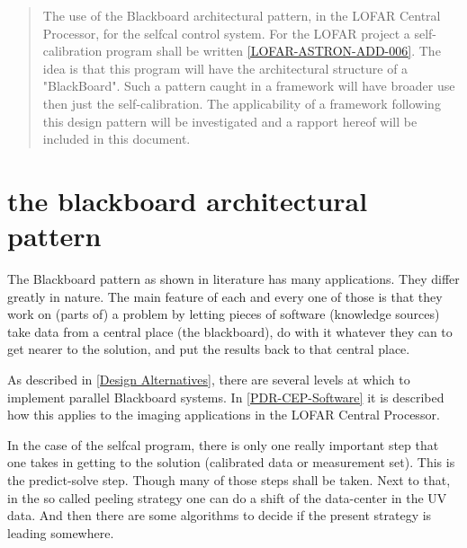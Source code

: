 \documentclass[]{lofar}
\begin{document}
  \maketitle

  \begin{abstract}

    The use of the Blackboard architectural pattern, in the LOFAR
    Central Processor, for the selfcal control system.  For the LOFAR
    project a self-calibration program shall be written
    \hyperlink{LOFAR-ASTRON-ADD-006}{[LOFAR-ASTRON-ADD-006]}. The idea
    is that this program will have the architectural structure of a
    "BlackBoard". Such a pattern caught in a framework will have
    broader use then just the self-calibration. The applicability of a
    framework following this design pattern will be investigated and a
    rapport hereof will be included in this document.

  \end{abstract}

  \tableofcontents

  \listoffigures

  \listoftables

  \section{the blackboard architectural pattern}
  \label{sec:blackboard-architectural-pattern}

    The Blackboard pattern as shown in literature has many
    applications. They differ greatly in nature. The main feature of
    each and every one of those is that they work on (parts of) a
    problem by letting pieces of software (knowledge sources) take
    data from a central place (the blackboard), do with it whatever
    they can to get nearer to the solution, and put the results back
    to that central place.

    As described in \hyperlink{bib:Design-Alternatives}{[Design Alternatives]}, there are
    several levels at which to implement parallel Blackboard
    systems. In \hyperlink{bib:PDR-CEP-Software}{[PDR-CEP-Software]} it is
    described how this applies to the imaging applications in the
    LOFAR Central Processor.

    In the case of the selfcal program, there is only one really
    important step that one takes in getting to the solution
    (calibrated data or measurement set). This is the predict-solve
    step. Though many of those steps shall be taken. Next to that, in
    the so called peeling strategy one can do a shift of the
    data-center in the UV data. And then there are some algorithms to
    decide if the present strategy is leading somewhere.
\end{document}
